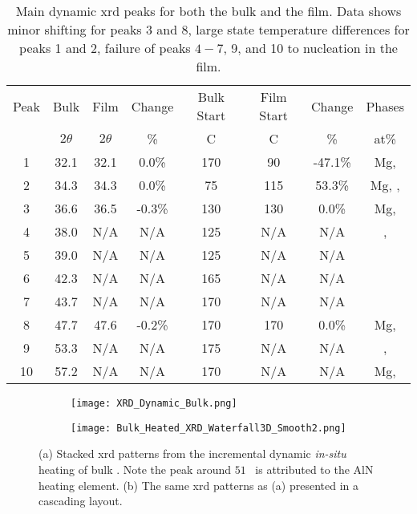 \documentclass[a4paper,12pt,oneside]{article}%
\begin{document}
\begin{table}[h]
	\centering
	\begin{tabular}{ c c c c c c c c }
		\toprule
		Peak & Bulk & Film & Change & Bulk Start & Film Start & Change & Phases \\
		& $2\theta$ & $2\theta$ & \% & \degree C & \degree C & \% & at\% \\
		\midrule
		1    & 32.1 & 32.1 & 0.0\%  & 170 & 90 & -47.1\% & Mg, \MgZn \\
		2    & 34.3 & 34.3 & 0.0\%  & 75  & 115 & 53.3\% & Mg, \MgZn, \CaMgZnFive \\
		3    & 36.6 & 36.5 & -0.3\% & 130 & 130 & 0.0\%  & Mg, \MgZn \\
		4    & 38.0 & N/A  & N/A    & 125 & N/A & N/A    & \MgZn, \CaMgZnFive \\
		5    & 39.0 & N/A  & N/A    & 125 & N/A & N/A    & \MgZn \\
		6    & 42.3 & N/A  & N/A    & 165 & N/A & N/A    & \CaMgZnFive \\
		7    & 43.7 & N/A  & N/A    & 170 & N/A & N/A    & \CaMgZnFive \\
		8    & 47.7 & 47.6 & -0.2\% & 170 & 170 & 0.0\%  & Mg, \MgZn \\
		9    & 53.3 & N/A  & N/A    & 175 & N/A & N/A    & \MgZn, \CaMgZnFive \\
		10   & 57.2 & N/A  & N/A    & 170 & N/A  & N/A   & Mg, \MgZn \\
		\bottomrule
	\end{tabular}
	\caption{Main dynamic \gls{xrd} peaks for both the bulk and the film. Data shows minor shifting for peaks 3 and 8, large state temperature differences for peaks 1 and 2, failure of peaks $4-7$, 9, and 10 to nucleation in the film.}
	\label{tab:Dynamic_XRD}
\end{table}

\begin{figure}[b]
	\centering
	\begin{subfigure}[htbp]{0.75\textwidth}
		\texttt{[image: XRD\_Dynamic\_Bulk.png]}
		\caption{}
		\label{fig:XRD_Dynamic_FullStack_Bulk}
	\end{subfigure}
	\begin{subfigure}[htbp]{0.75\textwidth}
		\texttt{[image: Bulk\_Heated\_XRD\_Waterfall3D\_Smooth2.png]}
		\caption{}
		\label{fig:XRD_Dynamic_WaterFall_Bulk}
	\end{subfigure}
	\caption{(a) Stacked \acrshort{xrd} patterns from the incremental dynamic \textit{in-situ} heating of bulk \MgZnCa. Note the peak around $51$\degree~ is attributed to the AlN heating element. (b) The same \acrshort{xrd} patterns as (a) presented in a cascading layout.}%
	\label{fig:XRD_Dynamic_Bulk}
\end{figure}
\end{document}

